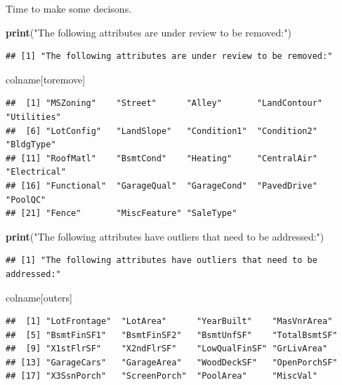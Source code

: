 \documentclass[]{article}
\newenvironment{Shaded}{\begin{snugshade}}{\end{snugshade}}
\newcommand{\KeywordTok}[1]{\textcolor[rgb]{0.13,0.29,0.53}{\textbf{#1}}}
\newcommand{\StringTok}[1]{\textcolor[rgb]{0.31,0.60,0.02}{#1}}
\newcommand{\NormalTok}[1]{#1}
\begin{document}
Time to make some decisons.

\begin{Shaded}
\begin{Highlighting}[]
\KeywordTok{print}\NormalTok{(}\StringTok{"The following attributes are under review to be removed:"}\NormalTok{)}
\end{Highlighting}
\end{Shaded}

\begin{verbatim}
## [1] "The following attributes are under review to be removed:"
\end{verbatim}

\begin{Shaded}
\begin{Highlighting}[]
\NormalTok{colname[toremove]}
\end{Highlighting}
\end{Shaded}

\begin{verbatim}
##  [1] "MSZoning"    "Street"      "Alley"       "LandContour" "Utilities"  
##  [6] "LotConfig"   "LandSlope"   "Condition1"  "Condition2"  "BldgType"   
## [11] "RoofMatl"    "BsmtCond"    "Heating"     "CentralAir"  "Electrical" 
## [16] "Functional"  "GarageQual"  "GarageCond"  "PavedDrive"  "PoolQC"     
## [21] "Fence"       "MiscFeature" "SaleType"
\end{verbatim}

\begin{Shaded}
\begin{Highlighting}[]
\KeywordTok{print}\NormalTok{(}\StringTok{"The following attributes have outliers that need to be addressed:"}\NormalTok{)}
\end{Highlighting}
\end{Shaded}

\begin{verbatim}
## [1] "The following attributes have outliers that need to be addressed:"
\end{verbatim}

\begin{Shaded}
\begin{Highlighting}[]
\NormalTok{colname[outers]}
\end{Highlighting}
\end{Shaded}

\begin{verbatim}
##  [1] "LotFrontage"  "LotArea"      "YearBuilt"    "MasVnrArea"  
##  [5] "BsmtFinSF1"   "BsmtFinSF2"   "BsmtUnfSF"    "TotalBsmtSF" 
##  [9] "X1stFlrSF"    "X2ndFlrSF"    "LowQualFinSF" "GrLivArea"   
## [13] "GarageCars"   "GarageArea"   "WoodDeckSF"   "OpenPorchSF" 
## [17] "X3SsnPorch"   "ScreenPorch"  "PoolArea"     "MiscVal"
\end{verbatim}
\end{document}

